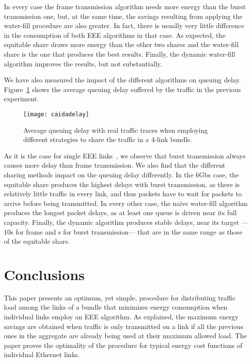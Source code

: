 \documentclass[journal,english,twocolumn,10pt,letterpaper]{IEEEtran}
\newcommand{\added}[1]{{#1}}
\begin{document}
In every case the frame transmission algorithm needs more energy than the
burst transmission one, but, at the same time, the savings resulting from
applying the water-fill procedure are also greater. In fact, there is usually
very little difference in the consumption of both EEE algorithms in that case.
As expected, the equitable share draws more energy than the other two shares
and the water-fill share is the one that produces the best results. Finally,
the dynamic water-fill algorithm improves the results, but not substantially.
 
We have also measured the impact of the different algorithms on queuing delay.
Figure~\ref{fig:caida-delay} shows the average queuing delay suffered by the
traffic in the previous experiment.
\begin{figure}
  \centering
  \texttt{[image: caidadelay]}
  \caption{Average queuing delay with real traffic traces when employing
    different strategies to share the traffic in a 4-link bundle.}
  \label{fig:caida-delay}
\end{figure}
As it is the case for single EEE
links~\cite{herreria12:_gi_g_model_gb_energ_effic_ether}, we observe that
burst transmission always causes more delay than frame transmission. We also
find that the different sharing methods impact on the queuing delay
differently. \added{In the 6Gbs case, the equitable share produces the
  highest delays with burst transmission, as there is relatively little
  traffic in every link, and thus packets have to wait for  packets to
  arrive before being transmitted. In every other case, the naïve water-fill
  algorithm produces the longest packet delays, as at least one queue is
  driven near its full capacity. Finally, the dynamic algorithm produces
  stable delays, near its target ---10s for frame and s for
  burst transmission--- that are in the same range as those of the equitable
  share.}

\section{Conclusions}
\label{sec:conclusions}

This paper presents an optimum, yet simple, procedure for distributing traffic
load among the links of a bundle that minimizes energy consumption when
individual links employ an EEE algorithm. As explained, the maximum energy
savings are obtained when traffic is only transmitted on a link if all the
previous ones in the aggregate are already being used at their maximum allowed
load. The paper proves the optimality of the procedure for typical energy cost
functions of individual Ethernet links.
\end{document}
